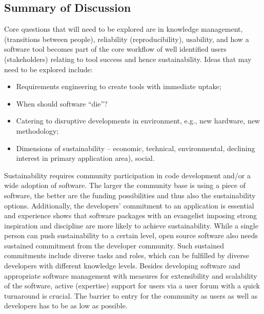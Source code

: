 \subsection{Summary of Discussion}

Core questions that will need to be explored are in knowledge management, 
(transitions between people), reliability (reproducibility), usability, and how a software tool becomes part of the core workflow of well identified users (stakeholders)
relating to tool success and hence sustainability.  Ideas 
that may need to be explored include:
\begin{itemize}

\item Requirements engineering to create tools with immediate uptake;

\item When should software ``die''?

\item Catering to disruptive developments in environment, e.g., new hardware,
new methodology;

\item Dimensions of sustainability -- economic, technical, environmental,
declining interest in primary application area),  social.

\end{itemize}

Sustainability requires community participation in code development and/or a
wide adoption of software. The larger the community base is using a piece of
software, the better are the funding possibilities and thus also the
sustainability options. Additionally, the developers’ commitment to an application is
essential and experience shows that software packages with an evangelist
imposing strong inspiration and discipline are more likely to achieve
sustainability. While a single person can push sustainability to a certain
level, open source software also needs sustained commitment from the developer
community. Such sustained commitments include diverse tasks and roles, which can
be fulfilled by diverse developers with different knowledge levels. Besides
developing software and appropriate software management with measures for
extensibility and scalability of the software, active (expertise) support for
users via a user forum with a quick turnaround is crucial. The barrier to entry
for the community as users as well as developers has to be as low as possible.

